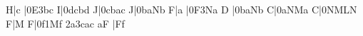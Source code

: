 \temps\Notes\bohu H|\qu c\enotes
\temps\notes|\Ilegl0E\dqh3bc\enotes
\barre\notes\bohu I|\qqh0dcbd\enotes
\temps\notes\bohu J|\qqh0cbac\enotes
\alaligne\notes\bohu J|\qqh0baNb\enotes
\temps\notes\bohu F\sk|\qu a\enotes
\temps\notes|\Ilegl0F\dqh3Na\enotes
\barre\notes{}\bohu D\relax
    |\qqh0baNb\enotes
\temps\notes\bohu C|\qqh0aNMa\enotes
\barre\notes{}\bohu C|\qqh0NMLN\enotes
\temps\NOtes\bohu F|\hu M\enotes
\barre\notes\bohu F|\itenu0f\itenl1M\bohl f\sk\sk
\itenu2a\itenu3c\zq a\cu c\qsk\enotes
\NOtes\pointdorgue a\bohu F\relax
  |\pointdurgue F\bohl f\enotes
\finmorceau   \rightline{\sl \aujourdhui}
\eject
\bye
\endinput
